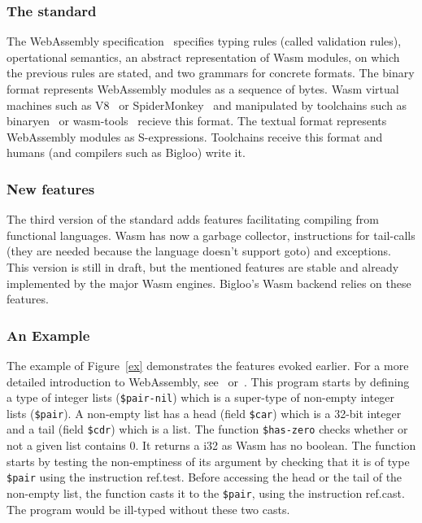 \documentclass[a4paper,11pt]{article}
\begin{document}
\subsubsection{The standard}
The WebAssembly specification~\cite{WebAssemblyCoreSpecification3} specifies
typing rules (called validation rules), opertational semantics, an abstract
representation of Wasm modules, on which the previous rules are stated, and two
grammars for concrete formats. The binary format represents WebAssembly modules
as a sequence of bytes. Wasm virtual machines such as V8~\cite{V8} or
SpiderMonkey~\cite{SpiderMonkey} and manipulated by toolchains such as
binaryen~\cite{Binaryen} or wasm-tools~\cite{WasmTools} recieve this format. The
textual format represents WebAssembly modules as S-expressions. Toolchains
receive this format and humans (and compilers such as Bigloo) write it.

\subsubsection{New features}
The third version of the standard adds features facilitating compiling from
functional languages. Wasm has now a garbage collector, instructions for
tail-calls (they are needed because the language doesn't support goto) and
exceptions. This version is still in draft, but the mentioned features are
stable and already implemented by the major Wasm engines. Bigloo's Wasm backend
relies on these features.

\subsubsection{An Example}
The example of Figure~\ref{ex} demonstrates the features evoked earlier. For a
more detailed introduction to WebAssembly,
see~\cite[Section~2.1]{phipps2023continuing} or~\cite{haas2017bringing}. This
program starts by defining a type of integer lists (\texttt{\$pair-nil}) which
is a super-type of non-empty integer lists (\texttt{\$pair}). A non-empty list
has a head (field \texttt{\$car}) which is a 32-bit integer and a tail (field
\texttt{\$cdr}) which is a list. The function \texttt{\$has-zero} checks whether
or not a given list contains 0. It returns a \textsf{i32} as Wasm has no
boolean. The function starts by testing the non-emptiness of its argument by
checking that it is of type \texttt{\$pair} using the instruction
\textsf{ref.test}. Before accessing the head or the tail of the non-empty list,
the function casts it to the \texttt{\$pair}, using the instruction
\textsf{ref.cast}. The program would be ill-typed without these two casts.
\end{document}
